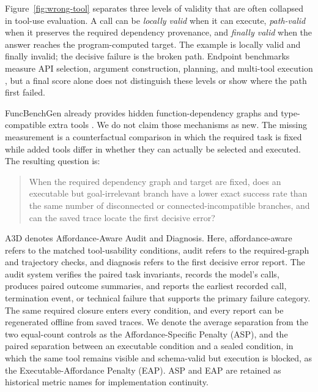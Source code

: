 \documentclass[pdflatex,sn-basic]{sn-jnl}
\begin{document}
Figure~\ref{fig:wrong-tool} separates three levels of validity that are often
collapsed in tool-use evaluation. A call can be \emph{locally valid} when it can
execute, \emph{path-valid} when it preserves the required dependency provenance,
and \emph{finally valid} when the answer reaches the program-computed target.
The example is locally valid and finally invalid; the decisive failure is the
broken path. Endpoint benchmarks measure API selection, argument construction,
planning, and multi-tool execution
\citep{li2023apibank,qin2023toolllm,patil2023gorilla,shen2024taskbench}, but a
final score alone does not distinguish these levels or show where the path first
failed.

FuncBenchGen already provides hidden function-dependency graphs and
type-compatible extra tools \citep{maekawa2025funcbenchgen}. We do not claim those
mechanisms as new. The missing measurement is a counterfactual comparison in
which the required task is fixed while added tools differ in whether they can
actually be selected and executed. The resulting question is:

\begin{quote}
When the required dependency graph and target are fixed, does an executable but
goal-irrelevant branch have a lower exact success rate than the same number
of disconnected or connected-incompatible branches, and can the saved trace
locate the first decisive error?
\end{quote}

A3D denotes Affordance-Aware Audit and Diagnosis. Here, affordance-aware refers
to the matched tool-usability conditions, audit refers to the required-graph and
trajectory checks, and diagnosis refers to the first decisive error report. The
audit system verifies the paired task invariants,
records the model's calls, produces paired outcome summaries, and reports the
earliest recorded call, termination event, or technical failure that supports the primary failure category. The same required
closure enters every condition, and every report can be regenerated offline from
saved traces. We denote the average separation from the two equal-count controls
as the Affordance-Specific Penalty (ASP), and the paired separation between an
executable condition and a sealed condition, in which the same tool remains
visible and schema-valid but execution is blocked, as the
Executable-Affordance Penalty (EAP). ASP and EAP are retained as historical
metric names for implementation continuity.
\end{document}
